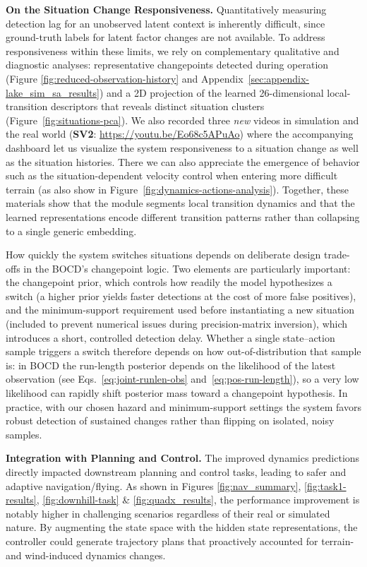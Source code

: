 \documentclass[Afour,sageh,times]{sagej}
\theoremstyle{lemma}
\begin{document}
\textbf{On the Situation Change Responsiveness.}
Quantitatively measuring detection lag for an unobserved latent context is inherently difficult, since ground-truth labels for latent factor changes are not available. To address responsiveness within these limits, we rely on complementary qualitative and diagnostic analyses: representative changepoints detected during operation (Figure \ref{fig:reduced-observation-history} and Appendix~\ref{sec:appendix-lake_sim_sa_results}) and a 2D projection of the learned 26-dimensional local-transition descriptors that reveals distinct situation clusters (Figure~\ref{fig:situations-pca}). We also recorded three \textit{new} videos in simulation and the real world (\textbf{SV2}: \url{https://youtu.be/Eo68c5APuAo}) where the accompanying dashboard let us visualize the system responsiveness to a situation change as well as the situation histories. There we can also appreciate the emergence of behavior such as the situation-dependent velocity control when entering more difficult terrain (as also show in Figure~\ref{fig:dynamics-actions-analysis}). Together, these materials show that the module segments local transition dynamics and that the learned representations encode different transition patterns rather than collapsing to a single generic embedding.

How quickly the system switches situations depends on deliberate design trade-offs in the BOCD's changepoint logic. Two elements are particularly important: the changepoint prior, which controls how readily the model hypothesizes a switch (a higher prior yields faster detections at the cost of more false positives), and the minimum-support requirement used before instantiating a new situation (included to prevent numerical issues during precision-matrix inversion), which introduces a short, controlled detection delay. Whether a single state–action sample triggers a switch therefore depends on how out-of-distribution that sample is: in BOCD the run-length posterior depends on the likelihood of the latest observation (see Eqs.~\ref{eq:joint-runlen-obs} and~\ref{eq:pos-run-length}), so a very low likelihood can rapidly shift posterior mass toward a changepoint hypothesis. In practice, with our chosen hazard and minimum-support settings the system favors robust detection of sustained changes rather than flipping on isolated, noisy samples.


\textbf{Integration with Planning and Control.}
The improved dynamics predictions directly impacted downstream planning and control tasks, leading to safer and adaptive navigation/flying. As shown in Figures \ref{fig:nav_summary}, \ref{fig:task1-results}, \ref{fig:downhill-task} \& \ref{fig:quadx_results}, the performance improvement is notably higher in challenging scenarios regardless of their real or simulated nature. By augmenting the state space with the hidden state representations, the controller could generate trajectory plans that proactively accounted for terrain- and wind-induced dynamics changes.
\end{document}
